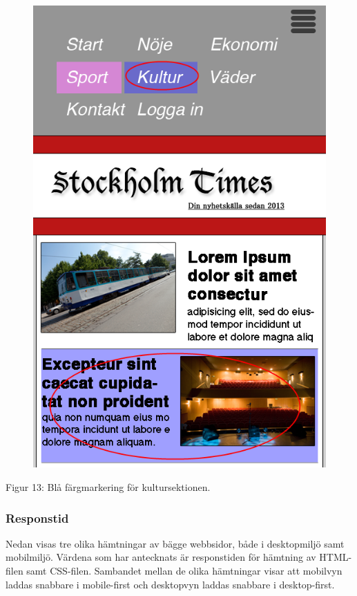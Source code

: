 \documentclass[11pt]{article}
\begin{document}
\begin{figure}[H]
{\includegraphics[scale=0.3]{pics/fargmobil.png}%
}
\end{figure}
\hspace{0.5cm}Figur 13: Blå färgmarkering för kultursektionen.


\subsubsection{Responstid}

Nedan visas tre olika hämtningar av bägge webbsidor, både i desktopmiljö samt mobilmiljö. Värdena som har antecknats är responstiden för hämtning av HTML-filen samt CSS-filen. Sambandet mellan de olika hämtningar visar att mobilvyn laddas snabbare i mobile-first och desktopvyn laddas snabbare i desktop-first.
\end{document}
